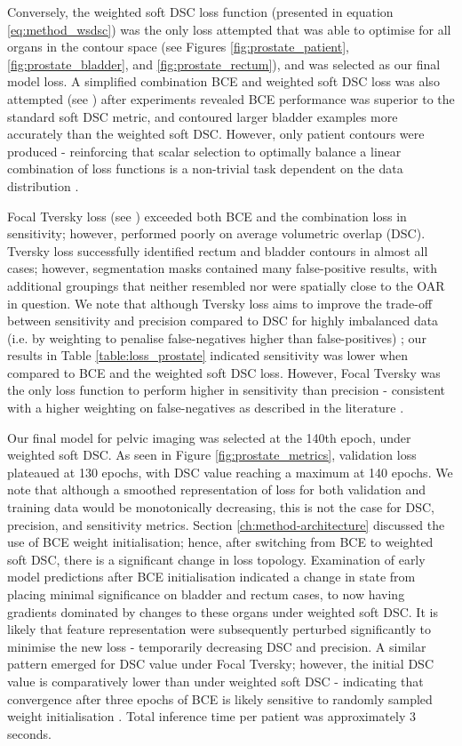 Conversely, the weighted soft DSC loss function (presented in equation \ref{eq:method_wsdsc}) was the only loss attempted that was able to optimise for all organs in the contour space (see Figures \ref{fig:prostate_patient}, \ref{fig:prostate_bladder}, and \ref{fig:prostate_rectum}), and was selected as our final model loss. A simplified combination BCE and weighted soft DSC loss was also attempted (see \cite{taghanaki2018}) after experiments revealed BCE performance was superior to the standard soft DSC metric, and contoured larger bladder examples more accurately than the weighted soft DSC. However, only patient contours were produced - reinforcing that scalar selection to optimally balance a linear combination of loss functions is a non-trivial task dependent on the data distribution \cite{Bertels2019}. 
 
Focal Tversky loss (see \cite{Khan2019}) exceeded both BCE and the combination loss in sensitivity; however, performed poorly on average volumetric overlap (DSC). Tversky loss successfully identified rectum and bladder contours in almost all cases; however, segmentation masks contained many false-positive results, with additional groupings that neither resembled nor were spatially close to the OAR in question. We note that although Tversky loss aims to improve the trade-off between sensitivity and precision compared to DSC for highly imbalanced data (i.e. by weighting to penalise false-negatives higher than false-positives) \cite{taghanaki2018}; our results in Table \ref{table:loss_prostate} indicated sensitivity was lower when compared to BCE and the weighted soft DSC loss. However, Focal Tversky was the only loss function to perform higher in sensitivity than precision - consistent with a higher weighting on false-negatives as described in the literature \cite{Khan2019}.



Our final model for pelvic imaging was selected at the 140th epoch, under weighted soft DSC. As seen in Figure \ref{fig:prostate_metrics}, validation loss plateaued at 130 epochs, with DSC value reaching a maximum at 140 epochs. We note that although a smoothed representation of loss for both validation and training data would be monotonically decreasing, this is not the case for DSC, precision, and sensitivity metrics. Section \ref{ch:method-architecture} discussed the use of BCE weight initialisation; hence, after switching from BCE to weighted soft DSC, there is a significant change in loss topology. Examination of early model predictions after BCE initialisation indicated a change in state from placing minimal significance on bladder and rectum cases, to now having gradients dominated by changes to these organs under weighted soft DSC. It is likely that feature representation were subsequently perturbed significantly to minimise the new loss - temporarily decreasing DSC and precision. A similar pattern emerged for DSC value under Focal Tversky; however, the initial DSC value is comparatively lower than under weighted soft DSC - indicating that convergence after three epochs of BCE is likely sensitive to randomly sampled weight initialisation \cite{Ronneberger_2015}. Total inference time per patient was approximately 3 seconds.

